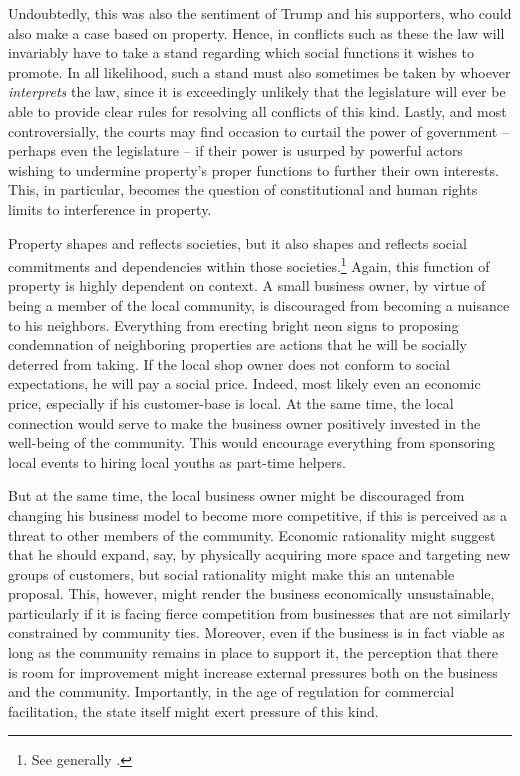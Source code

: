 Undoubtedly, this was also the sentiment of Trump and his supporters, who could also make a case based on property. Hence, in conflicts such as these the law will invariably have to take a stand regarding which social functions it wishes to promote. In all likelihood, such a stand must also sometimes be taken by whoever {\it interprets} the law, since it is exceedingly unlikely that the legislature will ever be able to provide clear rules for resolving all conflicts of this kind. Lastly, and most controversially, the courts may find occasion to curtail the power of government -- perhaps even the legislature -- if their power is usurped by powerful actors wishing to undermine property's proper functions to further their own interests. This, in particular, becomes the question of constitutional and human rights limits to interference in property.

Property shapes and reflects societies, but it also shapes and reflects social commitments and dependencies within those societies.\footnote{See generally \cite{alexander09}.} Again, this function of property is highly dependent on context. A small business owner, by virtue of being a member of the local community, is discouraged from becoming a nuisance to his neighbors. Everything from erecting bright neon signs to proposing condemnation of neighboring properties are actions that he will be socially deterred from taking. If the local shop owner does not conform to social expectations, he will pay a social price. Indeed, most likely even an economic price, especially if his customer-base is local. At the same time, the local connection would serve to make the business owner positively invested in the well-being of the community. This would encourage everything from sponsoring local events to hiring local youths as part-time helpers.

But at the same time, the local business owner might be discouraged from changing his business model to become more competitive, if this is perceived as a threat to other members of the community. Economic rationality might suggest that he should expand, say, by physically acquiring more space and targeting new groups of customers, but social rationality might make this an untenable proposal. This, however, might render the business economically unsustainable, particularly if it is facing fierce competition from businesses that are not similarly constrained by community ties. Moreover, even if the business is in fact viable as long as the community remains in place to support it, the perception that there is room for improvement might increase external pressures both on the business and the community. Importantly, in the age of regulation for commercial facilitation, the state itself might exert pressure of this kind.

